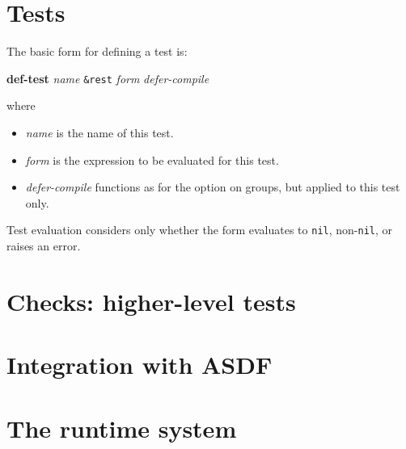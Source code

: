 \documentclass{article}
\begin{document}
\section{Tests}
The basic form for defining a test is:
\begin{center}
\textbf{def-test} \textit{name}
 \texttt{\&rest} \textit{form} \textit{defer-compile}
\end{center}
where
\begin{itemize}
\item\textit{name} is the name of this test.
\item\textit{form} is the expression to be evaluated for this test.
\item\textit{defer-compile} functions as for the option on groups, but
  applied to this test only.
\end{itemize}
Test evaluation considers only whether the form evaluates to
\texttt{nil}, non-\texttt{nil}, or raises an error.
\section{Checks: higher-level tests}
\section{Integration with ASDF}
\section{The runtime system}
\end{document}
